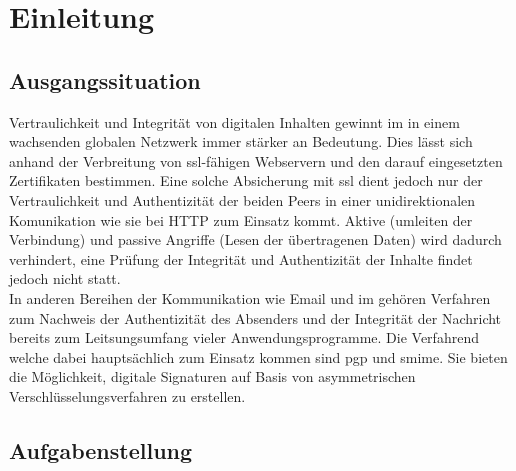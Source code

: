 \chapter{Einleitung}
%
\label{chp:einleitung}%



\section{Ausgangssituation}
%
\label{sec:einl:ausgangssituation}%

Vertraulichkeit und Integrität von digitalen Inhalten gewinnt im in einem wachsenden globalen Netzwerk immer stärker an Bedeutung. Dies lässt sich anhand der Verbreitung von \gls{ssl}-fähigen Webservern und den darauf eingesetzten Zertifikaten bestimmen. Eine solche Absicherung mit \gls{ssl} dient jedoch nur der Vertraulichkeit und Authentizität der beiden Peers in einer unidirektionalen Komunikation wie sie bei HTTP zum Einsatz kommt. Aktive (umleiten der Verbindung) und passive Angriffe (Lesen der übertragenen Daten) wird dadurch verhindert, eine Prüfung der Integrität und Authentizität der Inhalte findet jedoch nicht statt. \\
In anderen Bereihen der Kommunikation wie Email und \gls{im} gehören Verfahren zum Nachweis der Authentizität des Absenders und der Integrität der Nachricht bereits zum Leitsungsumfang vieler Anwendungsprogramme. Die Verfahrend welche dabei hauptsächlich zum Einsatz kommen sind \gls{pgp} und \gls{smime}. Sie bieten die Möglichkeit, digitale Signaturen auf Basis von asymmetrischen Verschlüsselungsverfahren zu erstellen.

\section{Aufgabenstellung}
%
\label{sec:einl:aufgabenstellung}%


